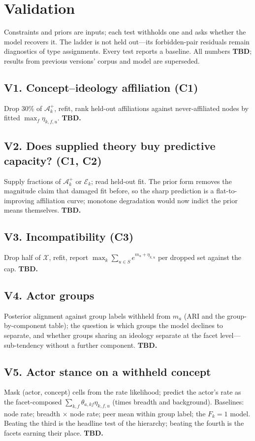 \documentclass[11pt]{article}
\newcommand{\Xcal}{\mathcal{X}}
\newcommand{\Acal}{\mathcal{A}}
\newcommand{\Ecal}{\mathcal{E}}
\newcommand{\1}{\mathbb{1}}
\begin{document}
\section{Validation}\label{sec:validation}

Constraints and priors are inputs; each test withholds one and asks whether the model recovers it. The ladder is not held out---its forbidden-pair residuals remain diagnostics of type assignments. Every test reports a baseline. All numbers \textbf{TBD}; results from previous versions' corpus and model are superseded.

\subsection*{V1. Concept--ideology affiliation (C1)}
Drop 30\% of $\Acal^+_k$, refit, rank held-out affiliations against never-affiliated nodes by fitted $\max_f\eta_{k,f,u}$. \textbf{TBD.}

\subsection*{V2. Does supplied theory buy predictive capacity? (C1, C2)}
Supply fractions of $\Acal^+_k$ or $\Ecal_k$; read held-out fit. The prior form removes the magnitude claim that damaged fit before, so the sharp prediction is a flat-to-improving affiliation curve; monotone degradation would now indict the prior means themselves. \textbf{TBD.}

\subsection*{V3. Incompatibility (C3)}
Drop half of $\Xcal$, refit, report $\max_k\sum_{u\in S}e^{m_u+\eta_{k,u}}$ per dropped set against the cap. \textbf{TBD.}

\subsection*{V4. Actor groups}
Posterior alignment against group labels withheld from $m_a$ (ARI and the group-by-component table); the question is which groups the model declines to separate, and whether groups sharing an ideology separate at the facet level---sub-tendency without a further component. \textbf{TBD.}

\subsection*{V5. Actor stance on a withheld concept}
Mask (actor, concept) cells from the rate likelihood; predict the actor's rate as the facet-composed $\sum_{k,f}\theta_{a,kf}\eta_{k,f,u}$ (times breadth and background). Baselines: node rate; breadth $\times$ node rate; peer mean within group label; the $F_k=1$ model. Beating the third is the headline test of the hierarchy; beating the fourth is the facets earning their place. \textbf{TBD.}
\end{document}
